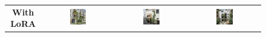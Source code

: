 \begin{figure}[H]
  \centering
  {\footnotesize
  \renewcommand{\arraystretch}{1.1}
  \setlength{\tabcolsep}{4pt}
  \begin{tabular}{c c c c}
    \textbf{With LoRA} &
    \includegraphics[width=0.25\textwidth]{Images/Results/Architect-A_unstructured-phase/generated_images/2/Met_lora_00015_.png} &
    \includegraphics[width=0.25\textwidth]{Images/Results/Architect-A_unstructured-phase/generated_images/2/Met_lora_00016_.png} &
    \includegraphics[width=0.25\textwidth]{Images/Results/Architect-A_unstructured-phase/generated_images/2/Met_lora_00017_.png} \\


\end{tabular}}
\end{figure}
